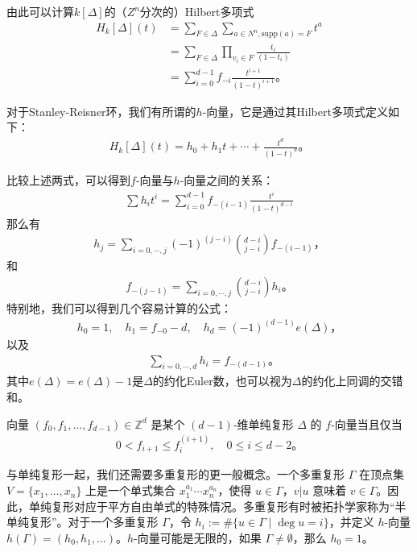 由此可以计算$k[\Delta]$的（$Z^n$分次的）Hilbert多项式
\begin{align*}
H_k[\Delta](t)& = \sum _{F \in \Delta} \sum_{a \in N^n, \text{supp}(a)=F} t^a\\
&=\sum_{F \in \Delta}\prod _{v_i \in F} \frac{t_i}{(1-t_i)}\\
&= \sum_{i=0}^{d-1} f_{-i} \frac{t^{i+1}}{(1-t)^{i+1}}。
\end{align*}

\begin{definition}
对于Stanley-Reisner环，我们有所谓的$h$-向量，它是通过其Hilbert多项式定义如下：
\begin{align*}
H_k[\Delta](t) = h_0 + h_1 t + \cdots + \frac{t^d}{(1-t)^d}。
\end{align*}
\end{definition}

比较上述两式，可以得到$f$-向量与$h$-向量之间的关系：
\begin{align*}
\sum h_i t^i = \sum_{i=0}^{d-1} f_{-(i-1)} \frac{t^i}{(1-t)^{d-i}}
\end{align*}
那么有
\begin{align*}
h_j = \sum _{i=0, \cdots, j} (-1)^{(j-i)} \binom{d-i}{j-i} f_{-(i-1)}，
\end{align*}
和
\begin{align*}
f_{-(j-1)} = \sum _{i=0, \cdots, j} \binom{d-i}{j-i} h_i。
\end{align*}
特别地，我们可以得到几个容易计算的公式：
\begin{align*}
h_0 = 1, \quad h_1 = f_{-0} - d, \quad h_d = (-1)^{(d-1)} e(\Delta)，
\end{align*}
以及
\begin{align*}
&\sum _{i=0, \cdots, d} h_i = f_{-(d-1)}。
\end{align*}
其中$e(\Delta) = e(\Delta)-1$是$\Delta$的约化Euler数，也可以视为$\Delta$的约化上同调的交错和。

\begin{theoreminner}
向量 $(f_0, f_1, \ldots, f_{d-1}) \in \mathbb{Z}^d$ 是某个 $(d-1)$-维单纯复形 $\Delta$ 的 $f$-向量当且仅当
\begin{align*}
0 < f_{i+1} \leq f_i^{(i+1)}, \quad 0 \leq i \leq d-2。
\end{align*}

\end{theoreminner}


与单纯复形一起，我们还需要多重复形的更一般概念。一个多重复形 $\Gamma$ 在顶点集 $V = \{x_1, \ldots, x_n\}$ 上是一个单式集合 $x_1^{a_1} \cdots x_n^{a_n}$，使得 $u \in \Gamma$，$v | u$ 意味着 $v \in \Gamma$。因此，单纯复形对应于平方自由单式的特殊情况。多重复形有时被拓扑学家称为“半单纯复形”。对于一个多重复形 $\Gamma$，令 $h_i := \# \{u \in \Gamma \mid \deg u = i\}$，并定义 $h$-向量 $h(\Gamma) = (h_0, h_1, \ldots)$。$h$-向量可能是无限的，如果 $\Gamma \neq \emptyset$，那么 $ h_0 = 1 $。

